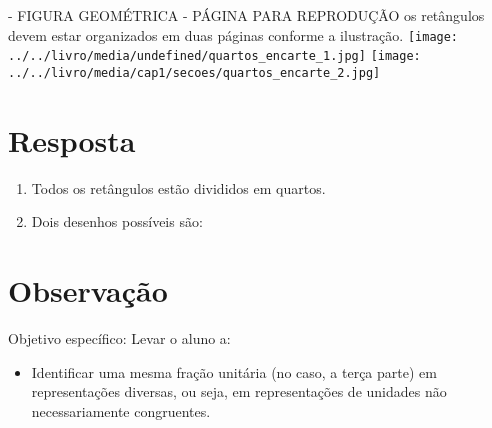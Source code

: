\documentclass{book}
\begin{document}
  \begin{imagem*}[breakable]{}{}
    \begin{nota*}[breakable]{}{}       - FIGURA GEOMÉTRICA - PÁGINA PARA REPRODUÇÃO
      os retângulos devem estar organizados em duas páginas conforme a ilustração.
                   \texttt{[image: ../../livro/media/undefined/quartos\_encarte\_1.jpg]}                     \texttt{[image: ../../livro/media/cap1/secoes/quartos\_encarte\_2.jpg]}
    \end{nota*}
  \end{imagem*}




\section{Resposta}
\begin{enumerate} [\quad a)] %
    \item       Todos os retângulos estão divididos em quartos.
    \item       Dois desenhos possíveis são:
\end{enumerate} %


\newpage


\section{Observação}
  Objetivo específico: Levar o aluno a:

\begin{itemize} %
    \item       Identificar uma mesma fração unitária (no caso, a terça parte) em representações diversas, ou seja, em representações de unidades não necessariamente congruentes.
\end{itemize} %
\end{document}
